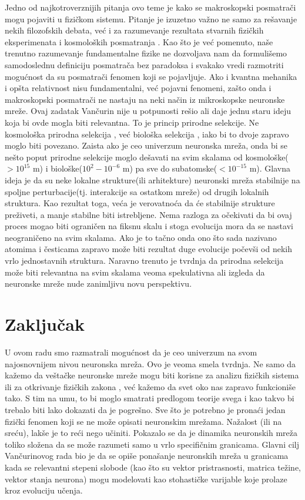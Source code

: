 \documentclass[a4paper]{article}
\begin{document}
Jedno od najkotroverznijih pitanja ovo teme je kako se makroskopski posmatrači mogu pojaviti u fizičkom sistemu. Pitanje je izuzetno važno ne samo za rešavanje nekih filozofskih debata, već i za razumevanje rezultata stvarnih fizičkih eksperimenata \cite{8} i kosmoloških posmatranja \cite{9}. Kao što je već pomenuto, naše trenutno razumevanje fundamentalne fizike ne dozvoljava nam da formulišemo samodoslednu definiciju posmatrača bez paradoksa i svakako vredi razmotriti mogućnost da su posmatrači fenomen koji se pojavljuje. Ako i kvantna mehanika i opšta relativnost nisu fundamentalni, već pojavni fenomeni, zašto onda i makroskopski posmatrači ne nastaju na neki način iz mikroskopske neuronske mreže. Ovaj zadatak Vančurin nije u potpunosti rešio ali daje jednu staru ideju koja bi ovde mogla biti relevantna. To je princip prirodne selekcije. Ne kosmološka prirodna selekcija \cite{10}, već biološka selekcija \cite{11}, iako bi to dvoje zapravo moglo biti povezano. Zaista ako je ceo univerzum neuronska mreža, onda bi se nešto poput prirodne selekcije moglo dešavati na svim skalama od kosmološke($>10^{15}$ m) i biološke($10^{2}-10^{-6}$ m) pa sve do subatomske($<10^{-15}$ m). Glavna ideja je da su neke lokalne strukture(ili arhitekture) neuronski mreža stabilnije na spoljne perturbacije(tj. interakcije sa ostatkom mreže) od drugih lokalnih struktura. Kao rezultat toga, veća je verovatnoća da će stabilnije strukture preživeti, a manje stabilne biti istrebljene. Nema razloga za očekivati da bi ovaj proces mogao biti ograničen na fiksnu skalu i stoga evolucija mora da se nastavi neograničeno na svim skalama. Ako je to tačno onda ono što sada nazivano atomima i česticama zapravo može biti rezultat duge evolucije počevši od nekih vrlo jednostavnih struktura. Naravno trenuto je tvrdnja da prirodna selekcija može biti relevantna na svim skalama veoma spekulativna ali izgleda da neuronske mreže nude zanimljivu novu perspektivu.
\section{Zaključak}

U ovom radu smo razmatrali mogućnost da je ceo univerzum na svom najosnovnijem nivou neuronska mreža. Ovo je veoma smela tvrdnja. Ne samo da kažemo da veštačke neuronske mreže mogu biti korisne za analizu fizičkih sistema \cite{2} ili za otkrivanje fizičkih zakona \cite{3}, već kažemo da svet oko nas zapravo funkcioniše tako. S tim na umu, to bi moglo smatrati predlogom teorije svega i kao takvo bi trebalo biti lako dokazati da je pogrešno. Sve što je potrebno je pronaći jedan fizički fenomen koji se ne može opisati neuronskim mrežama. Nažalost (ili na sreću), lakše je to reći nego učiniti. Pokazalo se da je dinamika neuronskih mreža toliko složena da se može razumeti samo u vrlo specifičnim granicama. Glavni cilj Vančurinovog rada bio je da se opiše ponašanje neuronskih mreža u granicama kada se relevantni stepeni slobode (kao što su vektor pristrasnosti, matrica težine, vektor stanja neurona) mogu modelovati kao stohastičke varijable koje prolaze kroz evoluciju učenja.

\printbibliography[
heading=bibintoc,
title={Literatura}
]
\end{document}
